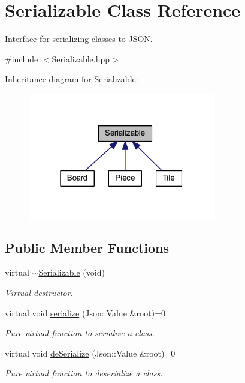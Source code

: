 \hypertarget{class_serializable}{\section{Serializable Class Reference}
\label{class_serializable}
}


Interface for serializing classes to J\-S\-O\-N.  




{\ttfamily \#include $<$Serializable.\-hpp$>$}



Inheritance diagram for Serializable\-:\nopagebreak
\begin{figure}[H]
\begin{center}
\leavevmode
\includegraphics[width=232pt]{class_serializable__inherit__graph}
\end{center}
\end{figure}
\subsection*{Public Member Functions}
\begin{DoxyCompactItemize}
\item 
\hypertarget{class_serializable_a3d7322ec8a0db1573bcabe1590723e31}{virtual \hyperlink{class_serializable_a3d7322ec8a0db1573bcabe1590723e31}{$\sim$\-Serializable} (void)}\label{class_serializable_a3d7322ec8a0db1573bcabe1590723e31}

\begin{DoxyCompactList}\small\item\em Virtual destructor. \end{DoxyCompactList}\item 
virtual void \hyperlink{class_serializable_aa18caa72dd5e441647f86cc7aab62096}{serialize} (Json\-::\-Value \&root)=0
\begin{DoxyCompactList}\small\item\em Pure virtual function to serialize a class. \end{DoxyCompactList}\item 
virtual void \hyperlink{class_serializable_ab423aaa267b7a0c7ad829128acde757c}{de\-Serialize} (Json\-::\-Value \&root)=0
\begin{DoxyCompactList}\small\item\em Pure virtual function to deserialize a class. \end{DoxyCompactList}\end{DoxyCompactItemize}


